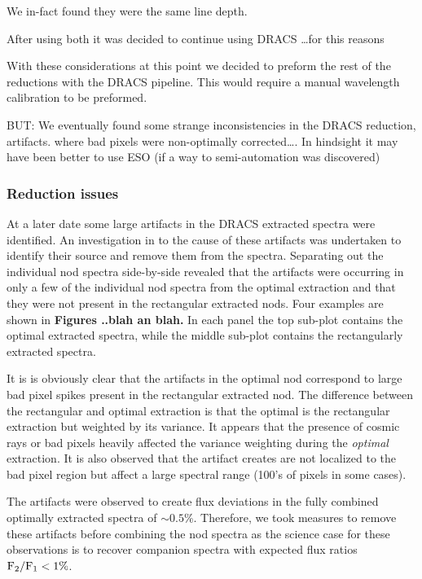 We in-fact found they were the same line depth.


After using both it was decided to continue using DRACS \ldots for this reasons

With these considerations at this point we decided to preform the rest of the reductions with the DRACS pipeline. This would require a manual wavelength calibration to be preformed. 


BUT: We eventually found some strange inconsistencies in the DRACS reduction, artifacts. where bad pixels were non-optimally corrected\ldots.
In hindsight it may have been better to use ESO (if a way to semi-automation was discovered)



\subsubsection{Reduction issues}
\label{subsubsec:reductionartifacts}
At a later date some large artifacts in the DRACS extracted spectra were identified. An investigation in to the cause of these artifacts was undertaken to identify their source and remove them from the spectra. Separating out the individual nod spectra side-by-side revealed that the artifacts were occurring in only a few of the individual nod spectra from the optimal extraction and that they were not present in the rectangular extracted nods. Four examples are shown in  \textbf{Figures ..blah an blah.} In each panel the top sub-plot contains the optimal extracted spectra, while the middle sub-plot contains the rectangularly extracted spectra.

It is is obviously clear that the artifacts in the optimal nod correspond to large bad pixel spikes present in the rectangular extracted nod. The difference between the rectangular and optimal extraction is that the optimal is the rectangular extraction but weighted by its variance. It appears that the presence of cosmic rays or bad pixels heavily affected the variance weighting during the \emph{optimal} extraction. It is also observed that the artifact creates are not localized to the bad pixel region but affect a large spectral range (100's of pixels in some cases). 

The artifacts were observed to create flux deviations in the fully combined optimally extracted spectra of \(\sim 0.5\% \). Therefore, we took measures to remove these artifacts before combining the nod spectra as the science case for these observations is to recover companion spectra with expected flux ratios \(\rm {F_2}/{F_1} < 1\% \). 

